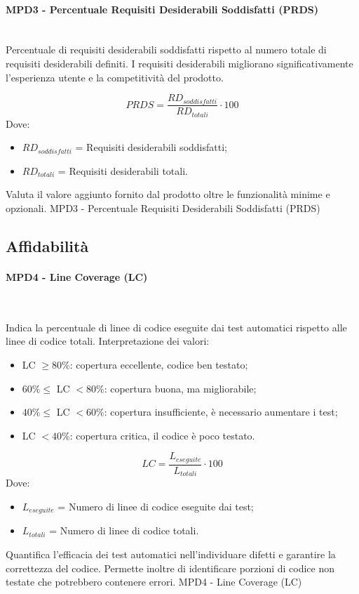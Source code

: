 \documentclass[10pt, letterpaper]{article}
\newcommand{\trisubsection}[1]{\paragraph{#1}\mbox{}\\}
\begin{document}
\trisubsection{MPD3 -  Percentuale Requisiti Desiderabili Soddisfatti (PRDS)}
{Percentuale di requisiti desiderabili soddisfatti rispetto al numero totale
    di requisiti desiderabili definiti.
    I requisiti desiderabili migliorano
    significativamente l'esperienza utente e la competitività del prodotto.}
{\[ PRDS =  \frac{RD_{soddisfatti}}{RD_{totali}} \cdot 100\]
    Dove:
    \begin{itemize}
        \item $RD_{soddisfatti}$ = Requisiti desiderabili soddisfatti;
        \item $RD_{totali}$ = Requisiti desiderabili totali.
    \end{itemize}
}
{Valuta il valore aggiunto fornito dal prodotto oltre le funzionalità minime e opzionali.}
{MPD3 - Percentuale Requisiti Desiderabili Soddisfatti (PRDS)}

\subsection{Affidabilità}
\trisubsection{MPD4 - Line Coverage (LC)}
{Indica la percentuale di linee di codice eseguite dai test automatici
    rispetto alle linee di codice totali.
    Interpretazione dei valori:
    \begin{itemize}
        \item LC $\geq 80\%$: copertura eccellente, codice ben testato;
        \item $60\% \leq $ LC $ < 80\%$: copertura buona, ma migliorabile;
        \item $40\% \leq $ LC $ < 60\%$: copertura insufficiente, è necessario aumentare i test;
        \item LC $< 40\%$: copertura critica, il codice è poco testato.
    \end{itemize}}
{\[ LC = \frac{L_{eseguite}}{L_{totali}} \cdot 100 \]
    Dove:
    \begin{itemize}
        \item $L_{eseguite}$ = Numero di linee di codice eseguite dai test;
        \item $L_{totali}$ = Numero di linee di codice totali.
    \end{itemize}}
{Quantifica l'efficacia dei test automatici nell'individuare difetti e garantire
    la correttezza del codice. Permette inoltre di identificare porzioni di
    codice non testate che potrebbero contenere errori.}
{MPD4 - Line Coverage (LC)}
\end{document}
